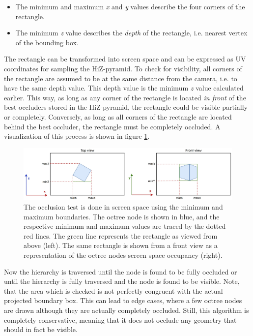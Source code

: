 \begin{itemize}
    \item The minimum and maximum \emph{x} and \emph{y} values describe the four corners of the rectangle.
    \item The minimum \emph{z} value describes the \emph{depth} of the rectangle, i.e. nearest vertex of the bounding box.
\end{itemize}

\noindent
The rectangle can be transformed into screen space and can be expressed as UV coordinates for sampling the 
\ac{HiZ}-pyramid. To check for visibility, all corners of the rectangle are assumed to be at the same distance 
from the camera, i.e. to have the same depth value. This depth value is the minimum \emph{z} value calculated earlier.
This way, as long as any corner of the rectangle is located \emph{in front} of the best occluders stored in the 
\ac{HiZ}-pyramid, the rectangle could be visible partially or completely. Conversely, as long as all corners of 
the rectangle are located behind the best occluder, the rectangle must be completely occluded. A visualization of 
this process is shown in figure \ref{fig:screen-space-occlusion-test}.

\begin{figure}[h]
    \centering
    \includegraphics[width=\linewidth]{images/graphics/screen_space_occlusion_test.jpg}
    \caption{The occlusion test is done in screen space using the minimum and maximum boundaries. The octree node 
    is shown in blue, and the respective minimum and maximum values are traced by the dotted red lines. The green 
    line represents the rectangle as viewed from above (left). The same rectangle is shown from a front view as a 
    representation of the octree nodes screen space occupancy (right).}
    \label{fig:screen-space-occlusion-test}
\end{figure}

\noindent
Now the hierarchy is traversed until the node is found to be fully occluded or until the hierarchy is fully traversed 
and the node is found to be visible. Note, that the area which is checked is not perfectly congruent with the actual 
projected boundary box. This can lead to edge cases, where a few octree nodes are drawn although they are actually 
completely occluded. Still, this algorithm is completely conservative, meaning that it does not occlude any geometry 
that should in fact be visible.

